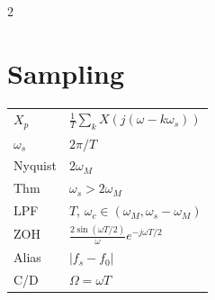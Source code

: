 \documentclass[11pt]{extarticle}
\begin{document}
\begin{paracol}{2}
\vspace{6pt}
\section*{Sampling}
\begin{tabular}{@{}l l@{}}
\toprule
$X_p$ & $\tfrac{1}{T}\!\sum_k X(j(\omega{-}k\omega_s))$ \\
$\omega_s$ & $2\pi/T$ \\
Nyquist & $2\omega_M$ \\
Thm & $\omega_s{>}2\omega_M$ \\
LPF & $T$, $\omega_c{\in}(\omega_M,\omega_s{-}\omega_M)$ \\
ZOH & $\tfrac{2\sin(\omega T/2)}{\omega}e^{-j\omega T/2}$ \\
Alias & $|f_s{-}f_0|$ \\
C/D & $\Omega{=}\omega T$ \\
\bottomrule
\end{tabular}

\switchcolumn


\end{paracol}
\end{document}
